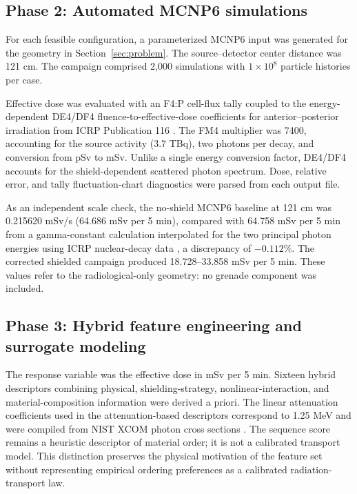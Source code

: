 \documentclass[preprint,12pt]{elsarticle}
\begin{document}
\subsection{Phase 2: Automated MCNP6 simulations}
For each feasible configuration, a parameterized MCNP6 input was generated for the geometry in Section~\ref{sec:problem}. The source--detector center distance was 121 cm. The campaign comprised 2,000 simulations with $1\times10^8$ particle histories per case.

Effective dose was evaluated with an F4:P cell-flux tally coupled to the energy-dependent DE4/DF4 fluence-to-effective-dose coefficients for anterior--posterior irradiation from ICRP Publication 116 \citep{ICRP116}. The FM4 multiplier was 7400, accounting for the source activity (3.7 TBq), two photons per  decay, and conversion from pSv to mSv. Unlike a single energy conversion factor, DE4/DF4 accounts for the shield-dependent scattered photon spectrum. Dose, relative error, and tally fluctuation-chart diagnostics were parsed from each output file.

As an independent scale check, the no-shield MCNP6 baseline at 121 cm was 0.215620 mSv/s (64.686 mSv per 5 min), compared with 64.758 mSv per 5 min from a gamma-constant calculation interpolated for the two principal  photon energies using ICRP nuclear-decay data \citep{ICRP107}, a discrepancy of $-0.112\%$. The corrected shielded campaign produced 18.728--33.858 mSv per 5 min. These values refer to the radiological-only geometry: no grenade component was included.

\subsection{Phase 3: Hybrid feature engineering and surrogate modeling}
The response variable was the effective dose in mSv per 5 min. Sixteen hybrid descriptors combining physical, shielding-strategy, nonlinear-interaction, and material-composition information were derived a priori. The linear attenuation coefficients used in the attenuation-based descriptors correspond to 1.25 MeV and were compiled from NIST XCOM photon cross sections \citep{XCOM}. The sequence score remains a heuristic descriptor of material order; it is not a calibrated transport model. This distinction preserves the physical motivation of the feature set without representing empirical ordering preferences as a calibrated radiation-transport law.
\end{document}
